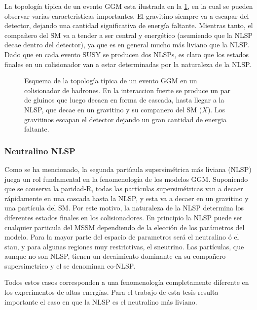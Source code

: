 La topología típica de un evento GGM esta ilustrada en la \cref{fig:ggm_event},
en la cual se pueden observar varias caracteristicas importantes. El gravitino
siempre va a escapar del detector, dejando una cantidad significativa de energía
faltante. Mientras tanto, el compañero del SM va a tender a ser central y
energético (asumiendo que la NLSP decae dentro del detector), ya que es en
general mucho más liviano que la NLSP. Dado que en cada evento SUSY se producen
dos NLSPs, es claro que los estados finales en un colisionador van a estar
determinadas por la naturaleza de la NLSP.


\begin{figure}[!htbp]
  \centering

  

  \caption{Esquema de la topología típica de un evento GGM en un colisionador de
    hadrones. En la interaccion fuerte se produce un par de gluinos que luego
    decaen en forma de cascada, hasta llegar a la NLSP, que decae en un
    gravitino {\gravino} y su companero del SM ($X$). Los gravitinos escapan el
    detector dejando un gran cantidad de energia faltante.}
  \label{fig:ggm_event}
\end{figure}


\subsubsection{Neutralino NLSP}

Como se ha mencionado, la segunda partícula supersimétrica más liviana (NLSP)
juega un rol fundamental en la fenomenología de los modelos GGM. Suponiendo que
se conserva la paridad-R, todas las partículas supersimétricas van a decaer
rápidamente en una cascada hasta la NLSP, y esta va a decaer en un gravitino y
una partícula del SM. Por este motivo, la naturaleza de la NLSP determina los
diferentes estados finales en los colisionadores. En principio la NLSP puede ser
cualquier particula del MSSM dependiendo de la elección de los parámetros del
modelo. Para la mayor parte del espacio de parametros será el neutralino ó el
stau, y para algunas regiones muy restrictivas, el
sneutrino\cite{arxiv:9801271}. Las partículas, que aunque no son NLSP, tienen un
decaimiento dominante en su compañero supersimetrico y el {\gravino} se
denominan co-NLSP.

Todos estos casos corresponden a una fenomenología completamente diferente en
los experimentos de altas energías. Para el trabajo de esta tesis resulta
importante el caso en que la NLSP es el neutralino más liviano.

